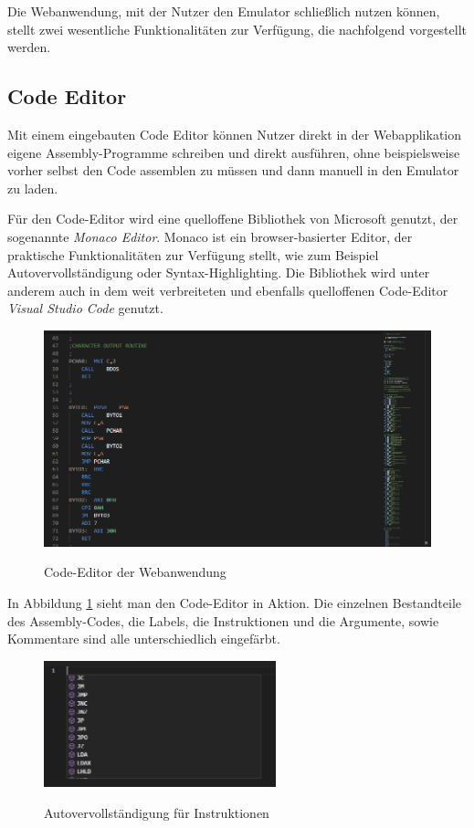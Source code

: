 Die Webanwendung, mit der Nutzer den Emulator schließlich nutzen können, stellt zwei wesentliche Funktionalitäten zur Verfügung, die nachfolgend vorgestellt werden.

\subsection{Code Editor}

Mit einem eingebauten Code Editor können Nutzer direkt in der Webapplikation eigene Assembly-Programme schreiben und direkt ausführen, ohne beispielsweise vorher selbst den Code assemblen zu müssen und dann manuell in den Emulator zu laden.

Für den Code-Editor wird eine quelloffene Bibliothek von Microsoft genutzt, der sogenannte \textit{Monaco Editor}. Monaco ist ein browser-basierter Editor, der praktische Funktionalitäten zur Verfügung stellt, wie zum Beispiel Autovervollständigung oder Syntax-Highlighting. Die Bibliothek wird unter anderem auch in dem weit verbreiteten und ebenfalls quelloffenen Code-Editor \textit{Visual Studio Code} genutzt.

\begin{figure}
    \caption{Code-Editor der Webanwendung}
    \centering
    \includegraphics[width=1.0\textwidth]{Bilder/CodeEditor.png}
    \label{fig:codeeditor}
\end{figure}

In Abbildung \ref{fig:codeeditor} sieht man den Code-Editor in Aktion. Die einzelnen Bestandteile des Assembly-Codes, die Labels, die Instruktionen und die Argumente, sowie Kommentare sind alle unterschiedlich eingefärbt.

\begin{figure}
    \caption{Autovervollständigung für Instruktionen}
    \centering
    \includegraphics[width=0.6\textwidth]{Bilder/Completion1.png}
    \label{fig:completion1}
\end{figure}

